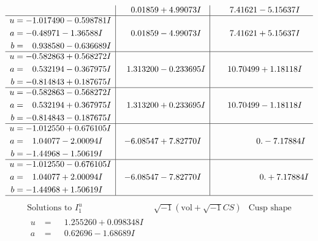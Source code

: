 \documentclass[1p]{elsarticle_modified}
\theoremstyle{definition}
\newcommand{\I}{\sqrt{-1}}
\begin{document}
$$\begin{array}{c|c|c}
 & \phantom{-}0.01859 + 4.99073 I & \phantom{-}7.41621 - 5.15637 I \\ \hline\begin{aligned}
u &= -1.017490 - 0.598781 I \\
a &= -0.48971 - 1.36588 I \\
b &= \phantom{-}0.938580 - 0.636689 I\end{aligned}
 & \phantom{-}0.01859 - 4.99073 I & \phantom{-}7.41621 + 5.15637 I \\ \hline\begin{aligned}
u &= -0.582863 + 0.568272 I \\
a &= \phantom{-}0.532194 - 0.367975 I \\
b &= -0.814843 + 0.187675 I\end{aligned}
 & \phantom{-}1.313200 - 0.233695 I & \phantom{-}10.70499 + 1.18118 I \\ \hline\begin{aligned}
u &= -0.582863 - 0.568272 I \\
a &= \phantom{-}0.532194 + 0.367975 I \\
b &= -0.814843 - 0.187675 I\end{aligned}
 & \phantom{-}1.313200 + 0.233695 I & \phantom{-}10.70499 - 1.18118 I \\ \hline\begin{aligned}
u &= -1.012550 + 0.676105 I \\
a &= \phantom{-}1.04077 - 2.00094 I \\
b &= -1.44968 - 1.50619 I\end{aligned}
 & -6.08547 + 7.82770 I & \phantom{-0.000000 } 0. - 7.17884 I \\ \hline\begin{aligned}
u &= -1.012550 - 0.676105 I \\
a &= \phantom{-}1.04077 + 2.00094 I \\
b &= -1.44968 + 1.50619 I\end{aligned}
 & -6.08547 - 7.82770 I & \phantom{-0.000000 -}0. + 7.17884 I\\
 \hline 
 \end{array}$$\newpage$$\begin{array}{c|c|c}  
\text{Solutions to }I^u_{1}& \I (\text{vol} + \sqrt{-1}CS) & \text{Cusp shape}\\
 \hline 
\begin{aligned}
u &= \phantom{-}1.255260 + 0.098348 I \\
a &= \phantom{-}0.62696 - 1.68689 I \\

\end{aligned}
\end{array}$$
\end{document}

